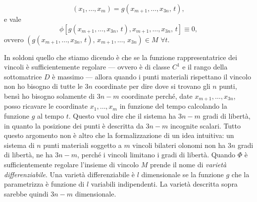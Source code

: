    \begin{equation}
        (x_1,\dots,x_m) = g(x_{m+1},\dots,x_{3n},\,t),
    \end{equation}
    e vale
    \begin{equation}
        \phi[g(x_{m+1},\dots,x_{3n},\,t),x_{m+1},\dots,x_{3n},\,t] \equiv 0,
    \end{equation}
    ovvero $(g(x_{m+1},\dots,x_{3n},\,t),\,x_{m+1},\dots,\,x_{3n}) \in M$ $\forall t$.
    
    In soldoni quello che stiamo dicendo è che se la funzione rappresentatrice dei vincoli è sufficientemente regolare --- ovvero è di classe $C^1$ e il rango della sottomatrice $D$ è massimo --- allora quando i punti materiali rispettano il vincolo non ho bisogno di tutte le $3n$ coordinate per dire dove si trovano gli $n$ punti, bensì ho bisogno solamente di $3n-m$ coordinate perché, date $x_{m+1},\dots,x_{3n}$, posso ricavare le coordinate $x_1,\dots,x_m$ in funzione del tempo calcolando la funzione $g$ al tempo $t$. Questo vuol dire che il sistema ha $3n-m$ gradi di libertà, in quanto la posizione dei punti è descritta da $3n-m$ incognite scalari. Tutto questo argomento non è altro che la formalizzazione di un idea intuitiva: un sistema di $n$ punti materiali soggetto a $m$ vincoli bilateri olonomi non ha $3n$ gradi di libertà, ne ha $3n-m$, perché i vincoli limitano i gradi di libertà. Quando $\Phi$ è sufficientemente regolare l'insieme di vincolo $M$ prende il nome di \emph{varietà differenziabile}. Una varietà differenziabile è $l$ dimensionale se la funzione $g$ che la parametrizza è funzione di $l$ variabili indipendenti. La varietà descritta sopra sarebbe quindi $3n-m$ dimensionale.
     
